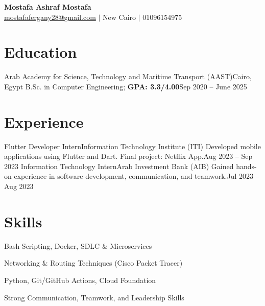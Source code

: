 \documentclass[letterpaper,10.5pt]{article}
\begin{document}

\begin{center}
    {\Huge \textbf{Mostafa Ashraf Mostafa}} \\ \vspace{5pt}
    \small
    \hspace{.5pt} \href{mailto:mostafafergany28@gmail.com}{mostafafergany28@gmail.com} 
    $|$ \hspace{.5pt} New Cairo
    $|$ \hspace{.5pt} 01096154975
\end{center}

\section{Education}
  \resumeSubHeadingListStart
    \resumeSubheading
      {Arab Academy for Science, Technology and Maritime Transport (AAST)}{Cairo, Egypt}
      {B.Sc. in Computer Engineering; \textbf{GPA: 3.3/4.00}}{Sep 2020 -- June 2025}
  \resumeSubHeadingListEnd

\section{Experience}
  \resumeSubHeadingListStart
    \resumeSubheading
      {Flutter Developer Intern}{Information Technology Institute (ITI)}
      {Developed mobile applications using Flutter and Dart. Final project: Netflix App.}{Aug 2023 -- Sep 2023}
    \resumeSubheading
      {Information Technology Intern}{Arab Investment Bank (AIB)}
      {Gained hands-on experience in software development, communication, and teamwork.}{Jul 2023 -- Aug 2023}
  \resumeSubHeadingListEnd

\section{Skills}
  \resumeSubHeadingListStart
    \item Bash Scripting, Docker, SDLC \& Microservices
    \item Networking \& Routing Techniques (Cisco Packet Tracer)
    \item Python, Git/GitHub Actions, Cloud Foundation
    \item Strong Communication, Teamwork, and Leadership Skills
  \resumeSubHeadingListEnd

\end{document}
